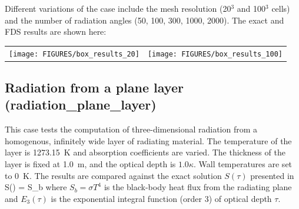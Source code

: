 \documentclass[11pt]{book}
\begin{document}
\noindent
Different variations of the case include the mesh resolution (20$^3$ and 100$^3$ cells)
and the number of radiation angles (50, 100, 300, 1000, 2000).
The exact and FDS results are shown here:

\begin{tabular*}{\textwidth}{lr}
\texttt{[image: FIGURES/box\_results\_20]} &
\texttt{[image: FIGURES/box\_results\_100]}
\end{tabular*}





\clearpage

\subsection{Radiation from a plane layer ({\bf radiation\_plane\_layer}) }

This case tests the computation of three-dimensional
radiation from a homogenous, infinitely wide layer of radiating
material.  The temperature of the layer is 1273.15~K and absorption
coefficients are varied. The thickness of the layer is fixed at 1.0~m,
and the optical depth is $1.0 \kappa$. Wall temperatures are set to 0~K.
The results are compared against the exact solution $S(\tau)$ presented
in~\cite{Zeldovich:1}
\be
S(\tau) = S_b
\ee
where $S_b = \sigma T^4$ is the black-body heat flux from
the radiating plane and $E_3(\tau)$ is the exponential
integral function (order 3) of optical depth $\tau$.
\end{document}
